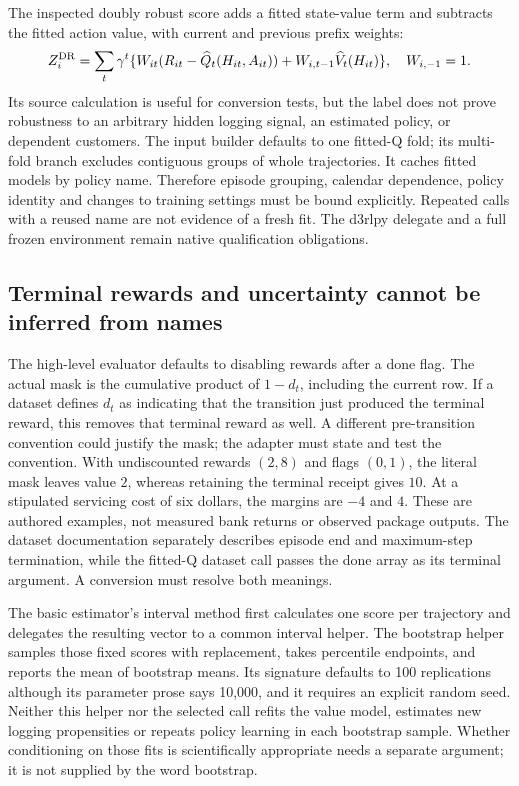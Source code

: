 The inspected doubly robust score adds a fitted state-value term and subtracts
the fitted action value, with current and previous prefix weights:
\[
 Z_i^{\rm DR}=\sum_t\gamma^t
 \{W_{it}(R_{it}-\widehat Q_t(H_{it},A_{it}))
       +W_{i,t-1}\widehat V_t(H_{it})\},\quad W_{i,-1}=1.
\]
Its source calculation is useful for conversion tests, but the label does not
prove robustness to an arbitrary hidden logging signal, an estimated policy,
or dependent customers. The input builder defaults to one fitted-Q fold; its
multi-fold branch excludes contiguous groups of whole trajectories. It caches
fitted models by policy name. Therefore episode grouping, calendar dependence,
policy identity and changes to training settings must be bound explicitly.
Repeated calls with a reused name are not evidence of a fresh fit. The d3rlpy
delegate and a full frozen environment remain native qualification obligations.
\citep{exec23_scope_rl_sources}

\subsection{Terminal rewards and uncertainty cannot be inferred from names}
\label{exec23:scope-rl-uncertainty}
The high-level evaluator defaults to disabling rewards after a done flag. The
actual mask is the cumulative product of $1-d_t$, including the current row.
If a dataset defines $d_t$ as indicating that the transition just produced the
terminal reward, this removes that terminal reward as well. A different
pre-transition convention could justify the mask; the adapter must state and
test the convention. With undiscounted rewards $(2,8)$ and flags $(0,1)$, the
literal mask leaves value $2$, whereas retaining the terminal receipt gives
$10$. At a stipulated servicing cost of six dollars, the margins are $-4$ and
$4$. These are authored examples, not measured bank returns or observed
package outputs. The dataset documentation separately describes episode end
and maximum-step termination, while the fitted-Q dataset call passes the done
array as its terminal argument. A conversion must resolve both meanings.
\citep{exec23_scope_rl_sources,exec23_scope_rl_reference}

The basic estimator's interval method first calculates one score per trajectory
and delegates the resulting vector to a common interval helper. The bootstrap
helper samples those fixed scores with replacement, takes percentile endpoints,
and reports the mean of bootstrap means. Its signature defaults to 100
replications although its parameter prose says 10,000, and it requires an
explicit random seed. Neither this helper nor the selected call refits the
value model, estimates new logging propensities or repeats policy learning in
each bootstrap sample. Whether conditioning on those fits is scientifically
appropriate needs a separate argument; it is not supplied by the word
bootstrap. \citep{exec23_scope_rl_sources}

